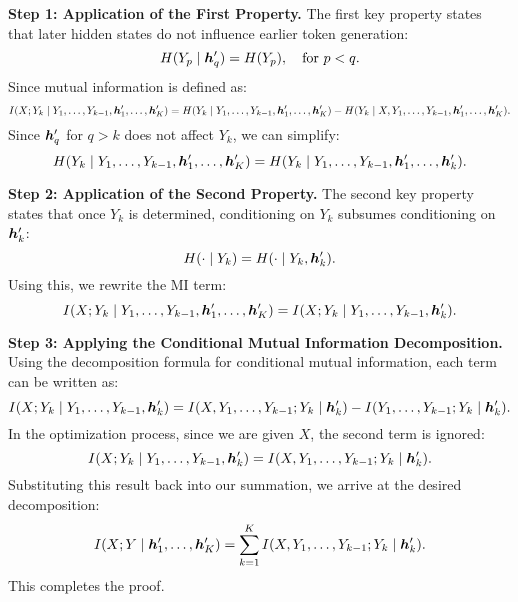 \textbf{Step 1: Application of the First Property.}
The first key property states that later hidden states do not influence earlier token generation:
\begin{equation}
    H(Y_p \mid {\bm{h}}'_q) = H(Y_p), \quad \text{for } p < q.
\end{equation}
Since mutual information is defined as:
\begin{equation}
    I(X; Y_k \mid Y_1, \dots, Y_{k-1}, {\bm{h}}'_1, \dots, {\bm{h}}'_K) = H(Y_k \mid Y_1, \dots, Y_{k-1}, {\bm{h}}'_1, \dots, {\bm{h}}'_K) - H(Y_k \mid X, Y_1, \dots, Y_{k-1}, {\bm{h}}'_1, \dots, {\bm{h}}'_K).
\end{equation}
Since ${\bm{h}}'_q$ for $q > k$ does not affect $Y_k$, we can simplify:
\begin{equation}
    H(Y_k \mid Y_1, \dots, Y_{k-1}, {\bm{h}}'_1, \dots, {\bm{h}}'_K) = H(Y_k \mid Y_1, \dots, Y_{k-1}, {\bm{h}}'_1, \dots, {\bm{h}}'_k).
\end{equation}

\textbf{Step 2: Application of the Second Property.}
The second key property states that once $Y_k$ is determined, conditioning on $Y_k$ subsumes conditioning on ${\bm{h}}'_k$:
\begin{equation}
    H(\cdot \mid Y_k) = H(\cdot \mid Y_k, {\bm{h}}'_k).
\end{equation}
Using this, we rewrite the MI term:
\begin{equation}
    I(X; Y_k \mid Y_1, \dots, Y_{k-1}, {\bm{h}}'_1, \dots, {\bm{h}}'_K) = I(X; Y_k \mid Y_1, \dots, Y_{k-1}, {\bm{h}}'_k).
\end{equation}

\textbf{Step 3: Applying the Conditional Mutual Information Decomposition.}
Using the decomposition formula for conditional mutual information, each term can be written as:
\begin{equation}
    I(X; Y_k \mid Y_1, \dots, Y_{k-1}, {\bm{h}}'_k) = I(X, Y_1, \dots, Y_{k-1}; Y_k \mid {\bm{h}}'_k) - I(Y_1, \dots, Y_{k-1}; Y_k \mid {\bm{h}}'_k).
\end{equation}
In the optimization process, since we are given $X$, the second term is ignored:
\begin{equation}
    I(X; Y_k \mid Y_1, \dots, Y_{k-1}, {\bm{h}}'_k) = I(X, Y_1, \dots, Y_{k-1}; Y_k \mid {\bm{h}}'_k).
\end{equation}
Substituting this result back into our summation, we arrive at the desired decomposition:
\begin{equation}
    I(X; Y \mid {\bm{h}}'_1, \dots, {\bm{h}}'_K) = \sum_{k=1}^{K} I(X, Y_1, \dots, Y_{k-1}; Y_k \mid {\bm{h}}'_k).
\end{equation}
This completes the proof.

